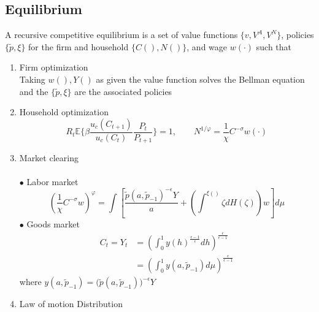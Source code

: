 \documentclass[a4paper,10pt]{article}  %
\begin{document}
\subsection{Equilibrium} %
\label{sub:equilibrium}

\begin{equil}
   A recursive competitive equilibrium is a set of value functions $ \Big\{ v, V^A, V^{N} \Big\} $,
   policies $ \{ \tilde{p}, \xi \} $ for the firm and household $ \Big\{ C( ), N( ) \Big\} $, 
   and wage $ w(\cdot) $ such that
   \begin{enumerate}
      
      \item Firm optimization \\
      Taking $ w(),Y() $ as given the value function solves the Bellman equation and
      the $ \{ \tilde{p}, \xi \} $ are the associated policies

      \item Household optimization \\
      \[
         R_t \mathbb{E} \bigg\{ \beta \frac{ u_c( C_{t+1} ) }{ u_c(C_t) } \frac{ P_{t} }{ P_{t+1} } \bigg\} = 1 , 
         \qquad
         N^{1/\varphi} = \frac{1}{\chi} C^{-\sigma}  w( \cdot )
      \]

      \item Market clearing \\ \ \\
      $\bullet $ Labor market
      \begin{equation}
         \label{eq:labor_market}
         \left( \frac{1}{\chi} C^{-\sigma}  w \right)^{\varphi} = 
         \int 
         \left[ 
            \frac{ \tilde{p}( a,\tilde{p}_{-1} )^{-\epsilon}Y }{ a }  + \left( \int^{\xi( )} \zeta dH( \zeta) \right) w 
         \right]d\mu
      \end{equation}
      $\bullet $ Goods market
      \begin{equation}
         \label{eq:goods_market}
         \begin{split}
            C_t = Y_t & = \left( \int_0^1 y(h)^{ \frac{\epsilon-1}{\epsilon} } dh \right)^{ \frac{\epsilon}{\epsilon-1} } \\
                      & = \left( \int_0^1 y( a,\tilde{p}_{-1} ) d\mu \right)^{ \frac{\epsilon}{\epsilon-1} }
         \end{split}
      \end{equation}
      where $ y( a,\tilde{p}_{-1} ) = \Big( \tilde{p}(a,\tilde{p}_{-1}) \Big)^{-\epsilon} Y  $
      \item Law of motion Distribution
   \end{enumerate}
\end{equil}
\end{document}

